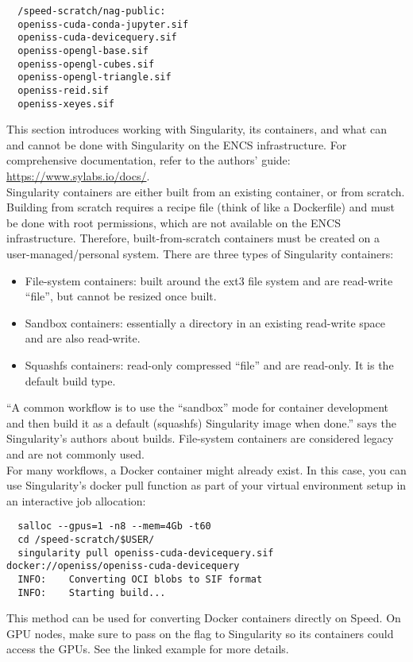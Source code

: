 \begin{verbatim}
  /speed-scratch/nag-public:
  openiss-cuda-conda-jupyter.sif
  openiss-cuda-devicequery.sif
  openiss-opengl-base.sif
  openiss-opengl-cubes.sif
  openiss-opengl-triangle.sif
  openiss-reid.sif
  openiss-xeyes.sif
\end{verbatim}

This section introduces working with Singularity, its containers, and what can and cannot 
be done with Singularity on the ENCS infrastructure. For comprehensive documentation, 
refer to the authors' guide: \url{https://www.sylabs.io/docs/}.\\

Singularity containers are either built from an existing container, or from scratch. 
Building from scratch requires a recipe file (think of like a Dockerfile) and
must be done with root permissions, which are not available on the ENCS infrastructure. 
Therefore, built-from-scratch containers must be created on a user-managed/personal system. 
There are three types of Singularity containers:

\begin{itemize}
  \item File-system containers: built around the ext3 file system and are read-write ``file'', but cannot be resized once built.
  \item Sandbox containers: essentially a directory in an existing read-write space and are also read-write.
  \item Squashfs containers: read-only compressed ``file'' and are read-only. It is the default build type.
\end{itemize}

\noindent
``A common workflow is to use the ``sandbox'' mode for container development and then build it as a 
default (squashfs) Singularity image when done.'' says the Singularity's authors about builds.
File-system containers are considered legacy and are not commonly used.\\

For many workflows, a Docker container might already exist. In this case, you can use Singularity's 
docker pull function as part of your virtual environment setup in an interactive job allocation:

\small
\begin{verbatim}
  salloc --gpus=1 -n8 --mem=4Gb -t60
  cd /speed-scratch/$USER/
  singularity pull openiss-cuda-devicequery.sif docker://openiss/openiss-cuda-devicequery
  INFO:    Converting OCI blobs to SIF format
  INFO:    Starting build...
\end{verbatim}
\normalsize

\noindent
This method can be used for converting Docker containers directly on Speed.
On GPU nodes, make sure to pass on the  flag to Singularity so its containers 
could access the GPUs. See the linked example for more details.
